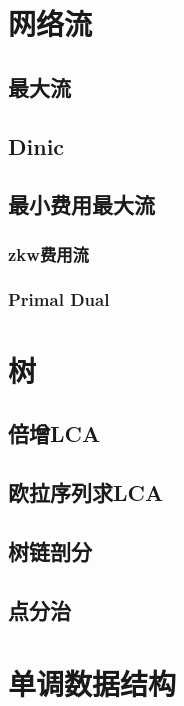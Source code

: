\documentclass{article}
\begin{document}
	\section{网络流}
		\subsection{最大流}
			\subsection{Dinic}
			

		\subsection{最小费用最大流}
			\subsubsection{zkw费用流}
			
			\subsubsection{Primal Dual}
			
	\newpage

	\section{树}
		\subsection{倍增LCA}
		
		\subsection{欧拉序列求LCA}
		
		\subsection{树链剖分}
		
		\subsection{点分治}

	\newpage

	\section{单调数据结构}
\end{document}
